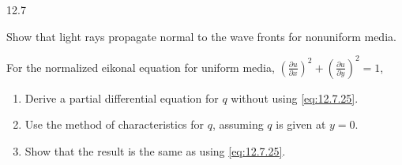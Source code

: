 \begin{exercises}{12.7}

\item \label{ex:12.7.1}
Show that light rays propagate normal to the wave fronts for nonuniform media.

\item \label{ex:12.7.2}
For the normalized eikonal equation for uniform media, $\left(\frac{\partial u}{\partial x}\right)^2 + \left(\frac{\partial u}{\partial y}\right)^2 = 1$,
\begin{enumerate}
\item[(a)] Derive a partial differential equation for $q$ without using \eqref{eq:12.7.25}.
\item[(b)] Use the method of characteristics for $q$, assuming $q$ is given at $y = 0$.
\item[(c)] Show that the result is the same as using \eqref{eq:12.7.25}.
\end{enumerate}

\end{exercises}

